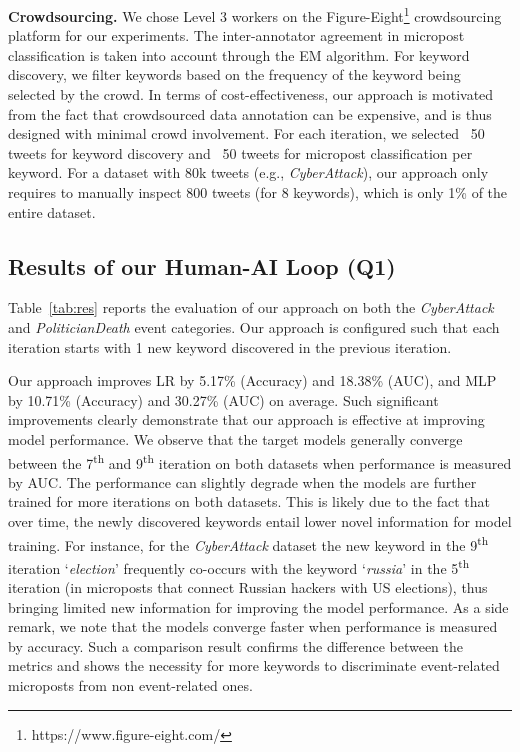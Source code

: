 \documentclass[letterpaper]{article}
\begin{document}
\smallskip
\noindent\textbf{Crowdsourcing.} We chose Level 3 workers on the Figure-Eight\footnote{https://www.figure-eight.com/} crowdsourcing platform for our experiments. The inter-annotator agreement in micropost classification is taken into account through the EM algorithm. For keyword discovery, we filter keywords based on the frequency of the keyword being selected by the crowd. In terms of cost-effectiveness, our approach is motivated from the fact that crowdsourced data annotation can be expensive, and is thus designed with minimal crowd involvement. For each iteration, we selected ~50 tweets for keyword discovery and ~50 tweets for micropost classification per keyword. For a dataset with 80k tweets (e.g., \emph{CyberAttack}), our approach only requires to manually inspect 800 tweets (for 8 keywords), which is only 1\% of the entire dataset.

\subsection{Results of our Human-AI Loop (Q1)}
Table~\ref{tab:res} reports the evaluation of our approach on both the \emph{CyberAttack} and \emph{PoliticianDeath} event categories. Our approach is configured such that each iteration starts with 1 new keyword discovered in the previous iteration. %


Our approach improves LR by 5.17\% (Accuracy) and 18.38\% (AUC), and MLP by 10.71\% (Accuracy) and 30.27\% (AUC) on average. Such significant improvements clearly demonstrate that our approach is effective at improving model performance. We observe that the target models generally converge between the 7\textsuperscript{th} and 9\textsuperscript{th} iteration on both datasets when performance is measured by AUC.
The performance can slightly degrade when the models are further trained for more iterations on both datasets. This is likely due to the fact that over time, the newly discovered keywords entail lower novel information for model training. For instance, for the \emph{CyberAttack} dataset the new keyword in the 9\textsuperscript{th} iteration \lq \textit{election}' frequently co-occurs with the keyword \lq \textit{russia}' in the 5\textsuperscript{th} iteration (in microposts that connect Russian hackers with US elections), thus bringing limited new information for improving the model performance. As a side remark, we note that the models converge faster when performance is measured by accuracy. Such a comparison result confirms the difference between the metrics and shows the necessity for more keywords to discriminate event-related microposts from non event-related ones.
\end{document}
